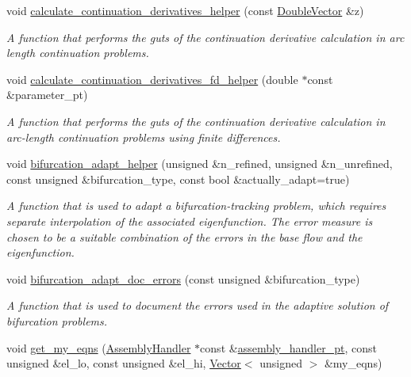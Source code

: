 \begin{DoxyCompactItemize}
void \hyperlink{classoomph_1_1Problem_a9e860f40a5ca15767d2174893c9084d4}{calculate\+\_\+continuation\+\_\+derivatives\+\_\+helper} (const \hyperlink{classoomph_1_1DoubleVector}{Double\+Vector} \&z)
\begin{DoxyCompactList}\small\item\em A function that performs the guts of the continuation derivative calculation in arc length continuation problems. \end{DoxyCompactList}\item 
void \hyperlink{classoomph_1_1Problem_a668e4c384b0513a943dee9411e640d74}{calculate\+\_\+continuation\+\_\+derivatives\+\_\+fd\+\_\+helper} (double $\ast$const \&parameter\+\_\+pt)
\begin{DoxyCompactList}\small\item\em A function that performs the guts of the continuation derivative calculation in arc-\/length continuation problems using finite differences. \end{DoxyCompactList}\item 
void \hyperlink{classoomph_1_1Problem_a27d31a7a78f5d01b9d0a5e07c0e06e5d}{bifurcation\+\_\+adapt\+\_\+helper} (unsigned \&n\+\_\+refined, unsigned \&n\+\_\+unrefined, const unsigned \&bifurcation\+\_\+type, const bool \&actually\+\_\+adapt=true)
\begin{DoxyCompactList}\small\item\em A function that is used to adapt a bifurcation-\/tracking problem, which requires separate interpolation of the associated eigenfunction. The error measure is chosen to be a suitable combination of the errors in the base flow and the eigenfunction. \end{DoxyCompactList}\item 
void \hyperlink{classoomph_1_1Problem_ad36cedd508f3cfb352ddd44c18914d41}{bifurcation\+\_\+adapt\+\_\+doc\+\_\+errors} (const unsigned \&bifurcation\+\_\+type)
\begin{DoxyCompactList}\small\item\em A function that is used to document the errors used in the adaptive solution of bifurcation problems. \end{DoxyCompactList}\item 
void \hyperlink{classoomph_1_1Problem_ae222ce1fa229441a733d350105dfd1f7}{get\+\_\+my\+\_\+eqns} (\hyperlink{classoomph_1_1AssemblyHandler}{Assembly\+Handler} $\ast$const \&\hyperlink{classoomph_1_1Problem_a2edfe33241276bdba87927aacead3099}{assembly\+\_\+handler\+\_\+pt}, const unsigned \&el\+\_\+lo, const unsigned \&el\+\_\+hi, \hyperlink{classoomph_1_1Vector}{Vector}$<$ unsigned $>$ \&my\+\_\+eqns)

\end{DoxyCompactItemize}
